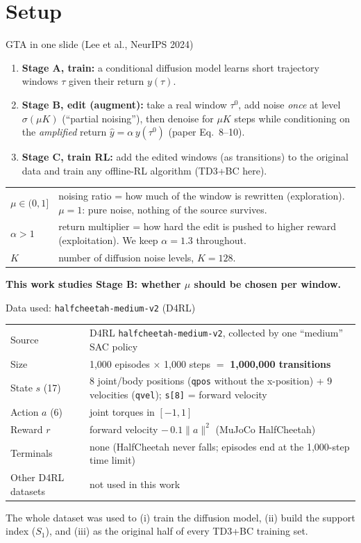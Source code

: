 \documentclass[aspectratio=169,11pt]{beamer}
\begin{document}
\section{Setup}
\begin{frame}{GTA in one slide (Lee et al., NeurIPS 2024)}
\begin{enumerate}
\item \textbf{Stage A, train:} a conditional diffusion model learns short trajectory windows $\tau$ given their return $y(\tau)$.
\item \textbf{Stage B, edit (augment):} take a real window $\tau^0$, add noise \emph{once} at level $\sigma(\mu K)$ (``partial noising''),
then denoise for $\mu K$ steps while conditioning on the \emph{amplified} return $\hat y=\alpha\, y(\tau^0)$ (paper Eq.~8--10).
\item \textbf{Stage C, train RL:} add the edited windows (as transitions) to the original data and train any offline-RL algorithm (TD3+BC here).
\end{enumerate}
\vspace{0.5em}
\begin{tabularx}{\linewidth}{lY}
\toprule
$\mu\in(0,1]$ & noising ratio = how much of the window is rewritten (exploration). $\mu=1$: pure noise, nothing of the source survives.\\
$\alpha>1$ & return multiplier = how hard the edit is pushed to higher reward (exploitation). We keep $\alpha=1.3$ throughout.\\
$K$ & number of diffusion noise levels, $K=128$.\\
\bottomrule
\end{tabularx}
\vspace{0.5em}
\textbf{This work studies Stage B: whether $\mu$ should be chosen per window.}
\end{frame}

\begin{frame}{Data used: \texttt{halfcheetah-medium-v2} (D4RL)}
\begin{tabularx}{\linewidth}{lY}
\toprule
Source & D4RL \texttt{halfcheetah-medium-v2}, collected by one ``medium'' SAC policy\\
Size & 1{,}000 episodes $\times$ 1{,}000 steps $=$ \textbf{1{,}000{,}000 transitions}\\
State $s$ (17) & 8 joint/body positions (\texttt{qpos} without the x-position) + 9 velocities (\texttt{qvel}); \texttt{s[8]} = forward velocity\\
Action $a$ (6) & joint torques in $[-1,1]$\\
Reward $r$ & forward velocity $-\,0.1\lVert a\rVert^2$ (MuJoCo HalfCheetah)\\
Terminals & none (HalfCheetah never falls; episodes end at the 1{,}000-step time limit)\\
Other D4RL datasets & not used in this work\\
\bottomrule
\end{tabularx}
\vspace{0.6em}

The whole dataset was used to (i) train the diffusion model, (ii) build the support index ($S_1$), and (iii) as the original half of every TD3+BC training set.
\end{frame}
\end{document}
